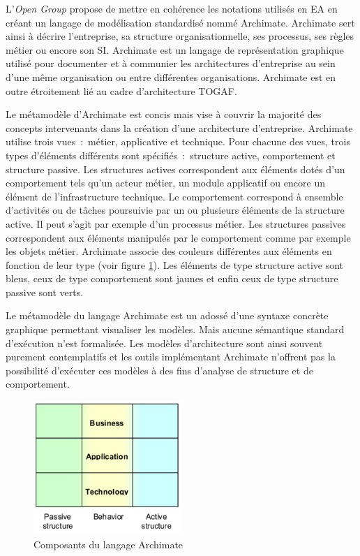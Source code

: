 L'\textit{Open Group} propose de mettre en cohérence les notations utilisés en EA en créant un langage de modélisation standardisé nommé Archimate. Archimate sert ainsi à décrire l'entreprise, sa structure organisationnelle, ses processus, ses règles métier ou encore son SI. Archimate est un langage de représentation graphique utilisé pour documenter et à communier les architectures d'entreprise au sein d'une même organisation ou entre différentes organisations. Archimate est en outre étroitement lié au cadre d'architecture TOGAF. 

Le métamodèle d'Archimate est concis mais vise à couvrir la majorité des concepts intervenants dans la création d'une architecture d'entreprise. Archimate utilise trois vues~:~métier, applicative et technique. Pour chacune des vues, trois types d'éléments différents sont spécifiés~:~structure active, comportement et structure passive. Les structures actives correspondent aux éléments dotés d'un comportement tels qu'un acteur métier, un module applicatif ou encore un élément de l'infrastructure technique. Le comportement correspond à ensemble d'activités ou de tâches poursuivie par un ou plusieurs éléments de la structure active. Il peut s'agit par exemple d'un processus métier. Les structures passives correspondent aux éléments manipulés par le comportement comme par exemple les objets métier. Archimate associe des couleurs différentes aux éléments en fonction de leur type (voir figure \ref{fig:archimate}). Les éléments de type structure active sont bleus, ceux de type comportement sont jaunes et enfin ceux de type structure passive sont verts. 

Le métamodèle du langage Archimate est un adossé d'une syntaxe concrète graphique permettant visualiser les modèles. Mais aucune sémantique standard d'exécution n'est formalisée. Les modèles d'architecture sont ainsi souvent purement contemplatifs et les outils implémentant Archimate n'offrent pas la possibilité d'exécuter ces modèles à des fins d'analyse de structure et de comportement. 

\begin{figure}[!htbp]
 \begin{center}
   \includegraphics[width=0.5\textwidth]{images/Chapitre1/archimate_core.png}
 \end{center}
 \caption{Composants du langage Archimate}
 \label{fig:archimate}
\end{figure}




